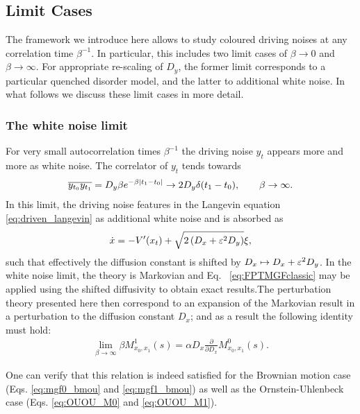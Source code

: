 \documentclass[%
 reprint,
superscriptaddress,
nofootinbib,
 amsmath,amssymb,
 aps,
prx,
]{revtex4-2}
\begin{document}
\subsection{Limit Cases}
\label{subsec:limit_cases}
The framework we introduce here allows to study coloured driving noises at any correlation time $\beta^{-1}$. In particular, this includes two limit cases of $\beta \to 0$ and $\beta \to \infty$. For appropriate re-scaling of $D_y$, the former limit corresponds to a particular quenched disorder model, and the latter to additional white noise. In what follows we discuss these limit cases in more detail.

\subsubsection{The white noise limit}
For very small autocorrelation times $\beta^{-1}$ the driving noise $y_t$ appears more and more as white noise. The correlator of $y_t$ tends towards
\begin{align}
    \overline{y_{t_0}y_{t_1}} = D_y \beta e^{-\beta|t_1-t_0|} \to  2 D_y \delta(t_1-t_0), \qquad \beta \to \infty.
\end{align}
In this limit, the driving noise features in the Langevin equation \eqref{eq:driven_langevin} as additional white noise and is absorbed as
\begin{align}
    \dot{x} = -V'(x_t) + \sqrt{2\left(D_x + \varepsilon^2 D_y  \right) }\xi,
\end{align}
such that effectively the diffusion constant is shifted by $D_x \mapsto D_x + \varepsilon^2 D_y$. In the white noise limit, the theory is Markovian and Eq.~ \eqref{eq:FPTMGFclassic} may be applied using the shifted diffusivity to obtain exact results.The perturbation theory presented here then correspond to an expansion of the Markovian result in a perturbation to the diffusion constant $D_x$; and as a result the following identity must hold:
\begin{align}
   \lim_{\beta \to \infty} \beta M^1_{x_0, x_1}(s) =\alpha D_x \frac{\partial }{\partial D_x} M^0_{x_0, x_1}(s) .
\end{align}

One can verify that this relation is indeed satisfied for the Brownian motion case (Eqs. \eqref{eq:mgf0_bmou} and \eqref{eq:mgf1_bmou}) as well as the Ornstein-Uhlenbeck case (Eqs. \eqref{eq:OUOU_M0} and \eqref{eq:OUOU_M1}).
\end{document}
